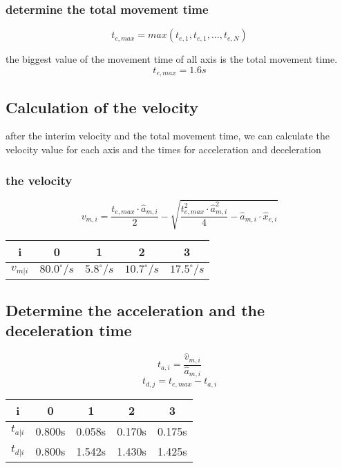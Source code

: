 \documentclass[%
  professionalfonts,%
  xcolor={%
    usenames,%
    dvipsnames,%
    svgnames,%
    table,%
    hyperref%
  }%
]{beamer}
\begin{document}
\subsubsection*{determine the total movement time}
\begin{frame}
\begin{equation*}
t_{e,max} = max(t_{e,1},t_{e,1},...,t_{e,N})
\end{equation*}

the biggest value of the movement time of all axis is the total movement time.
\begin{equation*}
t_{e,max} = 1.6s
\end{equation*}    

\subsection{Calculation of the velocity }
after the interim velocity and the total movement time, we can calculate the velocity value for each axis and the times for acceleration and deceleration

\subsubsection*{the velocity}
\begin{equation*}
v_{m,i} = \frac{t_{e,max} \cdot \hat{a}_{m,i}}{2}-\sqrt{\frac{t_{e,max}^2 \cdot \hat{a}_{m,i}^2}{4}-\hat{a}_{m,i}\cdot \hat{x}_{e,i}}
\end{equation*}

\begin{center}
\begin{tabular}{ccccc}
\toprule
i & 0 & 1 & 2 & 3 \\
\midrule
$v_{m|i}$  & $80.0^\circ/s$   & $5.8^\circ/s$   & $10.7^\circ/s$  & $17.5^\circ/s$ \\
\bottomrule 
\end{tabular}
\end{center}
\end{frame}

\subsection{Determine the acceleration and the deceleration time}
\begin{frame}
\begin{equation*}
t_{a,i} = \frac{\hat{v}_{m,i}}{\hat{a}_{m,i}}
\end{equation*}
\begin{equation*}
t_{d,j} = t_{e,max}-t_{a,i}
\end{equation*}    

\begin{center}
\begin{tabular}{ccccc}
\toprule
i & 0 & 1 & 2 & 3 \\
\midrule
$t_{a|i}$ & 0.800s & 0.058s & 0.170s & 0.175s \\ 
$t_{d|i}$ & 0.800s & 1.542s & 1.430s & 1.425s \\
\bottomrule
\end{tabular}
\end{center}
\end{frame}
\end{document}
